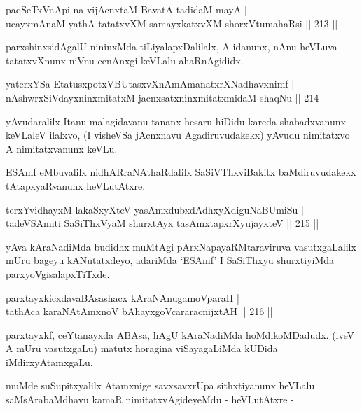 \begin{shl}
paqSeTxVnApi na vijAcnxtaM BavatA tadidaM mayA |\\
ucayxmAnaM yathA tatatxvXM samayxkatxvXM shorxVtumahaRsi \hfill || 213 ||
\end{shl}

\begin{artha}
parxshinxsidAgalU nininxMda tiLiyalapxDalilalx, A idanunx, nAnu heVLuva tatatxvXnunx niVnu cenAnxgi keVLalu ahaRnAgididx.
\end{artha}


\begin{shl}
yaterxYSa EtatusxpotxV\s BUtasxvXnAmAmanatxrXNadhavxnimf |\\
nAshwrxSiVdayxninxmitatxM jacnxsatxninxmitatxmidaM shaqNu \hfill || 214 ||
\end{shl}

\begin{artha}
yAvudaralilx Itanu malagidavanu tananx hesaru hiDidu kareda shabadxvanunx keVLaleV ilalxvo, (I visheVSa jAcnxnavu Agadiruvudakekx) yAvudu nimitatxvo A nimitatxvanunx keVLu.
\end{artha}

\begin{artha}
ESAmf eMbuvalilx nidhARraNAthaRdalilx SaSiVThxviBakitx baMdiruvudakekx tAtapxyaRvanunx heVLutAtxre.
\end{artha}

\begin{shl}
terxYvidhayxM lakaSxyXteV yasAmxdubxdAdhxyXdiguNaBUmiSu |\\
tadeVSAmiti SaSiThxVyaM shurxtAyx tasAmxtapxrXyujayxteV \hfill || 215 ||
\end{shl}

\begin{artha}
yAva kAraNadiMda budidhx muMtAgi pArxNapayaRMtaraviruva vasutxgaLalilx mUru bageyu kANutatxdeyo, adariMda `ESAmf' I SaSiThxyu shurxtiyiMda parxyoVgisalapxTiTxde.
\end{artha}

\begin{shl}
parxtayxkicxdavaBAsashacx kAraNAnugamoV\s paraH |\\
tathAca karaNAtAmxnoV bAhayxgoVcararacnijxtAH \hfill || 216 ||
\end{shl}

\begin{artha}
parxtayxkf, ceYtanayxda ABAsa, hAgU kAraNadiMda hoMdikoMDadudx. (iveV A mUru vasutxgaLu) matutx horagina viSayagaLiMda kUDida iMdirxyAtamxgaLu. 
\end{artha}
\begin{artha}
muMde suSupitxyalilx Atamxnige savxsavxrUpa sithxtiyanunx heVLalu saMsArabaMdhavu kamaR nimitatxvAgideyeMdu - heVLutAtxre -
\end{artha}

